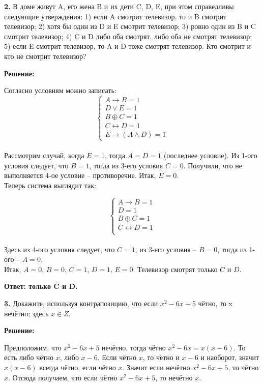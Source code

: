 \documentclass[a4paper,12pt]{article} %
\begin{document}
{\bf 2.} В доме живут A, его жена B и их дети C, D, E, при этом справедливы
следующие утверждения:
1) если A смотрит телевизор, то и B смотрит телевизор;
2) хотя бы один из D и E смотрит телевизор;
3) ровно один из B и C смотрит телевизор;
4) C и D либо оба смотрят, либо оба не смотрят телевизор;
5) если E смотрит телевизор, то A и D тоже смотрят телевизор.
Кто смотрит и кто не смотрит телевизор?

\begin{center}
\bfseries
\newpage
{\Large Решение: }
\end{center}
Согласно условиям можно записать:
  \[\begin{cases}
    A \rightarrow B = 1\\
    D \vee E = 1\\
    B \oplus C = 1\\
    C \leftrightarrow D = 1\\
    E \rightarrow (A \wedge D) = 1
 \end{cases}\]\\
Рассмотрим случай, когда $E = 1$, тогда $A = D = 1$ (последнее условие). Из 1-ого условия следует, что $B = 1$, тогда из 3-его условия $C = 0$. Получили, что не выполняется 4-ое условие -- противоречие. Итак, $E = 0$.\\
Теперь система выглядит так:
 
   \[\begin{cases}
    A \rightarrow B = 1\\
    D = 1\\
    B \oplus C = 1\\
    C \leftrightarrow D = 1\\
 \end{cases}\]\\
 Здесь из 4-ого условия следует, что $C = 1$, из 3-его условия -- $B = 0$, тогда из 1-ого -- $A = 0$. \\
 Итак, $A = 0$, $B = 0$, $C = 1$, $D = 1$, $E = 0$. Телевизор смотрят только $C$ и $D$.

\begin{flushright}
\begin{large}
\textbf {Ответ: только C и D.}
\end{large}
\end{flushright}

       
{\bf 3.} Докажите, используя контрапозицию, что если $x^2 - 6x + 5$ чётно, то x нечётно; здесь $x \in Z$.
\begin{center}
\bfseries
{\Large Решение: }
\end{center}
Предположим, что $x^2 - 6x + 5$ нечётно, тогда чётно $x^2 - 6x = x(x-6)$. То есть либо чётно $x$, либо $x-6$. Если чётно $x$, то чётно и $x-6$ и наоборот, значит $x(x-6)$ всегда чётно, если чётно $x$. Значит если нечётно  $x^2 - 6x + 5$, то чётно $x$. Отсюда получаем, что если чётно $x^2 - 6x + 5$, то нечётно $x$.
\end{document}
